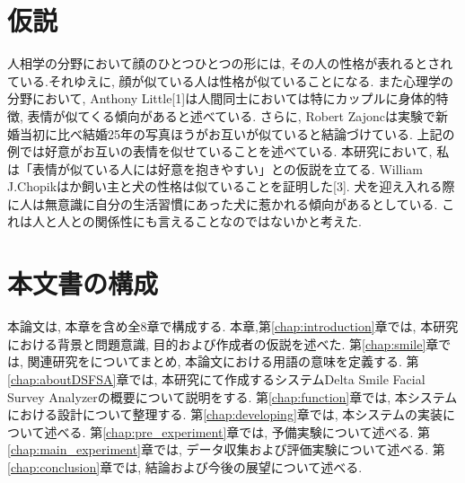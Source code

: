 
\section{仮説}
人相学の分野において顔のひとつひとつの形には, その人の性格が表れるとされている.それゆえに, 顔が似ている人は性格が似ていることになる.
また心理学の分野において, Anthony Little[1]は人間同士においては特にカップルに身体的特徴, 表情が似てくる傾向があると述べている.\cite{AnthonyLittle}
さらに, Robert Zajoncは実験で新婚当初に比べ結婚25年の写真ほうがお互いが似ていると結論づけている.\cite{RobertZajonc}
上記の例では好意がお互いの表情を似せていることを述べている.
本研究において, 私は「表情が似ている人には好意を抱きやすい」との仮説を立てる.
William J.Chopikはか飼い主と犬の性格は似ていることを証明した[3]. 犬を迎え入れる際に人は無意識に自分の生活習慣にあった犬に惹かれる傾向があるとしている.
これは人と人との関係性にも言えることなのではないかと考えた.



\section{本文書の構成}

本論文は, 本章を含め全8章で構成する. 本章,第\ref{chap:introduction}章では, 本研究における背景と問題意識, 目的および作成者の仮説を述べた.
第\ref{chap:smile}章では, 関連研究をについてまとめ, 本論文における用語の意味を定義する.
第\ref{chap:aboutDSFSA}章では, 本研究にて作成するシステムDelta Smile Facial Survey Analyzerの概要について説明をする.
第\ref{chap:function}章では, 本システムにおける設計について整理する.
第\ref{chap:developing}章では, 本システムの実装について述べる.
第\ref{chap:pre_experiment}章では, 予備実験について述べる.
第\ref{chap:main_experiment}章では, データ収集および評価実験について述べる.
第\ref{chap:conclusion}章では, 結論および今後の展望について述べる.
